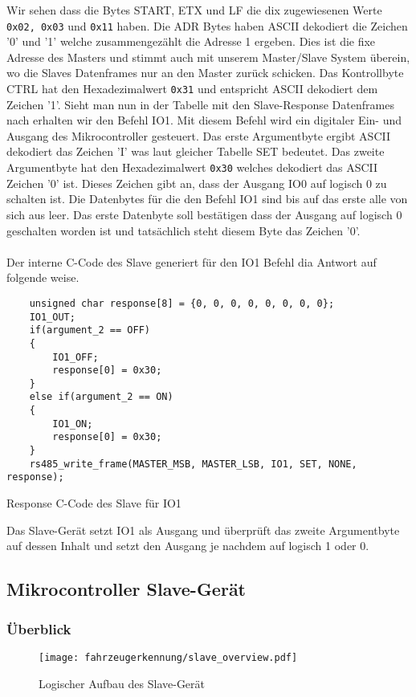 Wir sehen dass die Bytes START, ETX und LF die dix zugewiesenen Werte \texttt{0x02, 0x03} und \texttt{0x11} haben. Die ADR Bytes haben ASCII dekodiert die Zeichen '0' und '1' welche zusammengezählt die Adresse 1 ergeben. 
Dies ist die fixe Adresse des Masters und stimmt auch mit unserem Master/Slave System überein, wo die Slaves Datenframes nur an den Master zurück schicken. Das Kontrollbyte CTRL hat den Hexadezimalwert \texttt{0x31} 
und entspricht ASCII dekodiert dem Zeichen '1'. Sieht man nun in der Tabelle mit den Slave-Response Datenframes nach erhalten wir den Befehl IO1. Mit diesem Befehl wird ein digitaler Ein- und Ausgang des Mikrocontroller gesteuert.
Das erste Argumentbyte ergibt ASCII dekodiert das Zeichen 'I' was laut gleicher Tabelle SET bedeutet. Das zweite Argumentbyte hat den Hexadezimalwert \texttt{0x30} welches dekodiert das ASCII Zeichen '0' ist. Dieses Zeichen gibt an,
dass der Ausgang IO0 auf logisch 0 zu schalten ist. Die Datenbytes für die den Befehl IO1 sind bis auf das erste alle von sich aus leer. Das erste Datenbyte soll bestätigen dass der Ausgang auf logisch 0 geschalten worden ist und tatsächlich steht 
diesem Byte das Zeichen '0'.  
\\ \\
Der interne C-Code des Slave generiert für den IO1 Befehl dia Antwort auf folgende weise.
\begin{listing}[H]
    \begin{verbatim}
    unsigned char response[8] = {0, 0, 0, 0, 0, 0, 0, 0};
    IO1_OUT;
    if(argument_2 == OFF)
    {
        IO1_OFF; 
        response[0] = 0x30;
    }
    else if(argument_2 == ON)
    {
        IO1_ON;
        response[0] = 0x30;
    }
    rs485_write_frame(MASTER_MSB, MASTER_LSB, IO1, SET, NONE, response);
    \end{verbatim}
    \caption{Response C-Code des Slave für IO1}
  \end{listing}

Das Slave-Gerät setzt IO1 als Ausgang und überprüft das zweite Argumentbyte auf dessen Inhalt und setzt den Ausgang je nachdem auf logisch 1 oder 0.
\pagebreak
\subsection{Mikrocontroller Slave-Gerät}
\subsubsection{Überblick}

\begin{figure}[H]
    \centering
    \texttt{[image: fahrzeugerkennung/slave\_overview.pdf]}
    \caption{Logischer Aufbau des Slave-Gerät}
\end{figure}

